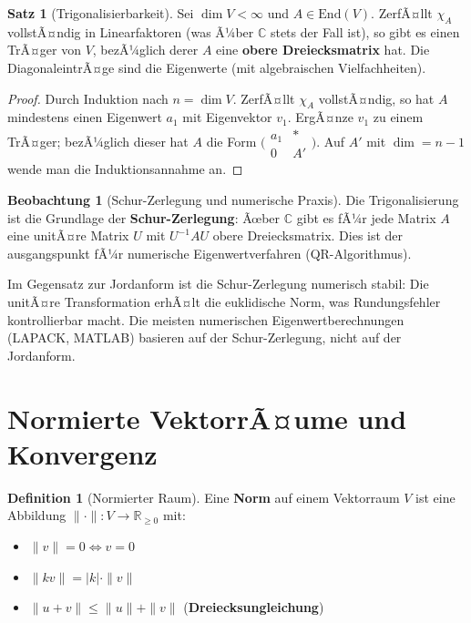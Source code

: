 ﻿\documentclass[a4paper,12pt]{report}
\theoremstyle{definition}
\newtheorem{definition}{Definition}
\newtheorem{satz}{Satz}
\newtheorem{beobachtung}{Beobachtung}
\begin{document}
\begin{satz}[Trigonalisierbarkeit]
    Sei $\dim V < \infty$ und $A \in \mathrm{End}(V)$. ZerfÃ¤llt $\chi_A$
    vollstÃ¤ndig in Linearfaktoren (was Ã¼ber $\mathbb{C}$ stets der Fall ist),
    so gibt es einen TrÃ¤ger von $V$, bezÃ¼glich derer $A$ eine
    \textbf{obere Dreiecksmatrix} hat. Die DiagonaleintrÃ¤ge sind die Eigenwerte
    (mit algebraischen Vielfachheiten).
\end{satz}
\begin{proof}
    Durch Induktion nach $n = \dim V$. ZerfÃ¤llt $\chi_A$ vollstÃ¤ndig,
    so hat $A$ mindestens einen Eigenwert $a_1$ mit Eigenvektor $v_1$.
    ErgÃ¤nze $v_1$ zu einem TrÃ¤ger; bezÃ¼glich dieser hat $A$ die Form
    $\bigl(\begin{smallmatrix} a_1 & * \\ 0 & A' \end{smallmatrix}\bigr)$.
    Auf $A'$ mit $\dim = n-1$ wende man die Induktionsannahme an.
\end{proof}

\begin{beobachtung}[Schur-Zerlegung und numerische Praxis]
    Die Trigonalisierung ist die Grundlage der \textbf{Schur-Zerlegung}:
    Ãœber $\mathbb{C}$ gibt es fÃ¼r jede Matrix $A$ eine unitÃ¤re Matrix $U$
    mit $U^{-1}AU$ obere Dreiecksmatrix. Dies ist der
    ausgangspunkt fÃ¼r numerische Eigenwertverfahren (QR-Algorithmus).

    Im Gegensatz zur Jordanform ist die Schur-Zerlegung numerisch stabil:
    Die unitÃ¤re Transformation erhÃ¤lt die euklidische Norm, was
    Rundungsfehler kontrollierbar macht. Die meisten numerischen
    Eigenwertberechnungen (LAPACK, MATLAB) basieren auf der Schur-Zerlegung,
    nicht auf der Jordanform.
\end{beobachtung}

\section{Normierte VektorrÃ¤ume und Konvergenz}

\begin{definition}[Normierter Raum]
    Eine \textbf{Norm} auf einem Vektorraum $V$ ist eine Abbildung
    $\|\cdot\| : V \to \mathbb{R}_{\ge 0}$ mit:
    \begin{itemize}
        \item[-] $\|v\| = 0 \Leftrightarrow v = 0$
        \item[-] $\|kv\| = |k| \cdot \|v\|$
        \item[-] $\|u + v\| \le \|u\| + \|v\|$ \quad (\textbf{Dreiecksungleichung})
    \end{itemize}
\end{definition}
\end{document}
